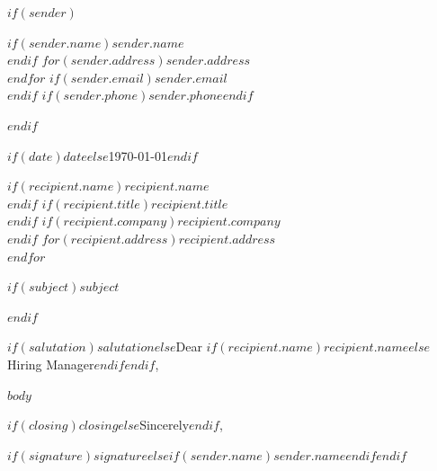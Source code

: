 \documentclass[$if(fontsize)$$fontsize$$else$11pt$endif$]{article}
\begin{document}
$if(sender)$
\begin{flushright}
$if(sender.name)$\textbf{$sender.name$}\\$endif$
$for(sender.address)$$sender.address$\\$endfor$
$if(sender.email)$\href{mailto:$sender.email$}{$sender.email$}\\$endif$
$if(sender.phone)$$sender.phone$$endif$
\end{flushright}
$endif$

\vspace{1em}

$if(date)$$date$$else$\today$endif$

\vspace{1.5em}

$if(recipient.name)$$recipient.name$\\$endif$
$if(recipient.title)$$recipient.title$\\$endif$
$if(recipient.company)$$recipient.company$\\$endif$
$for(recipient.address)$$recipient.address$\\$endfor$

\vspace{1.5em}

$if(subject)$\textbf{$subject$}

\vspace{0.5em}
$endif$

$if(salutation)$$salutation$$else$Dear $if(recipient.name)$$recipient.name$$else$Hiring Manager$endif$$endif$,

$body$

$if(closing)$$closing$$else$Sincerely$endif$,

\vspace{2.5em}

$if(signature)$$signature$$else$$if(sender.name)$$sender.name$$endif$$endif$
\end{document}
